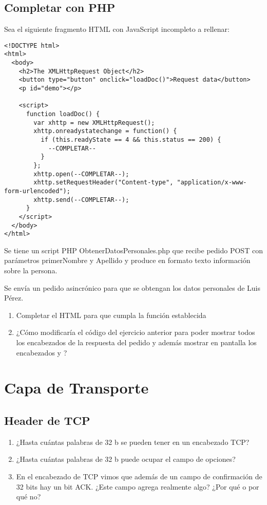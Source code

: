 \documentclass[12pt]{report}
\begin{document}
\begin{exer}
\section{Completar con PHP \stwo}
Sea el siguiente fragmento HTML con JavaScript incompleto a rellenar:

\begin{verbatim}
<!DOCTYPE html>
<html>
  <body>
    <h2>The XMLHttpRequest Object</h2>
    <button type="button" onclick="loadDoc()">Request data</button>
    <p id="demo"></p>
    
    <script>
      function loadDoc() {
        var xhttp = new XMLHttpRequest();
        xhttp.onreadystatechange = function() {
          if (this.readyState == 4 && this.status == 200) {
            --COMPLETAR--
          }
        };
        xhttp.open(--COMPLETAR--);
        xhttp.setRequestHeader("Content-type", "application/x-www-form-urlencoded");
        xhttp.send(--COMPLETAR--);
      }
    </script>
  </body>
</html>
\end{verbatim} 

Se tiene un script PHP ObtenerDatosPersonales.php que recibe pedido POST con parámetros
primerNombre y Apellido y produce en formato texto información sobre la persona.

Se envía un pedido asincrónico para que se obtengan los datos personales de Luis Pérez.

\begin{enumerate}
\item Completar el HTML para que cumpla la función establecida
\item ¿Cómo modificaría el código del ejercicio anterior para poder mostrar todos los
encabezados de la respuesta del pedido y además mostrar en pantalla los encabezados
 y ?
\end{enumerate}
\end{exer}

%
%

\chapter{Capa de Transporte}

\begin{exer}
\section{Header de TCP \sthree \steo}
\begin{enumerate}
\item ¿Hasta cuántas palabras de 32 b se pueden tener en un encabezado TCP?
\item ¿Hasta cuántas palabras de 32 b puede ocupar el campo de opciones?
\item En el encabezado de TCP vimos que además de un campo de confirmación de 32 bits hay
un bit ACK. ¿Este campo agrega realmente algo? ¿Por qué o por qué no?
\end{enumerate}
\end{exer}
\end{document}
